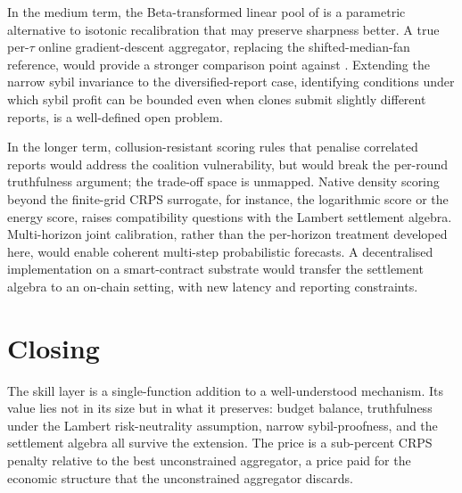 \documentclass[
  11pt,
  a4paper,
  oneside]{report}
\begin{document}
In the medium term, the Beta-transformed linear pool of
\citet{gneiting2013combining} is a parametric alternative to isotonic
recalibration that may preserve sharpness better. A true per-\(\tau\)
online gradient-descent aggregator, replacing the shifted-median-fan
reference, would provide a stronger comparison point against
\citet{vitali2025intermittent}. Extending the narrow sybil invariance to
the diversified-report case, identifying conditions under which sybil
profit can be bounded even when clones submit slightly different
reports, is a well-defined open problem.

In the longer term, collusion-resistant scoring rules that penalise
correlated reports would address the \citet{chun2011cooperating}
coalition vulnerability, but would break the per-round truthfulness
argument; the trade-off space is unmapped. Native density scoring beyond
the finite-grid CRPS surrogate, for instance, the logarithmic score or
the energy score, raises compatibility questions with the Lambert
settlement algebra. Multi-horizon joint calibration, rather than the
per-horizon treatment developed here, would enable coherent multi-step
probabilistic forecasts. A decentralised implementation on a
smart-contract substrate would transfer the settlement algebra to an
on-chain setting, with new latency and reporting constraints.

\section{Closing}\label{closing}

The skill layer is a single-function addition to a well-understood
mechanism. Its value lies not in its size but in what it preserves:
budget balance, truthfulness under the Lambert risk-neutrality
assumption, narrow sybil-proofness, and the settlement algebra all
survive the extension. The price is a sub-percent CRPS penalty relative
to the best unconstrained aggregator, a price paid for the economic
structure that the unconstrained aggregator discards.


\end{document}
